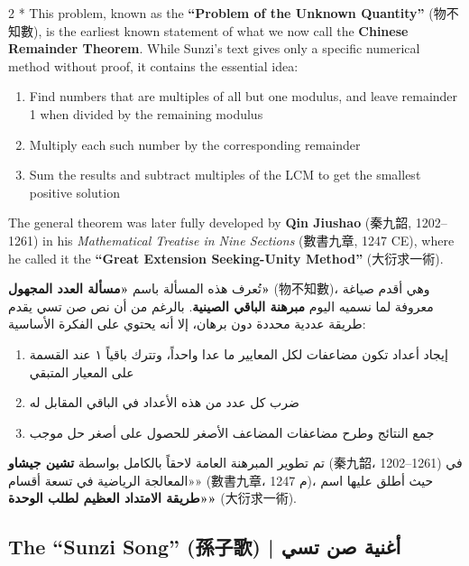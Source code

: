 \documentclass[11pt,a4paper]{article}
\newcommand{\ar}[1]{\arabicfont\beginR #1\endR}
\newcommand{\zh}[1]{{\CJKfamily{}#1}}
\begin{document}
\begin{paracol}{2}
\switchcolumn[0]*\noindent
This problem, known as the \textbf{``Problem of the Unknown Quantity''} (\zh{物不知數}), is the earliest known statement of what we now call the \textbf{Chinese Remainder Theorem}. While Sunzi's text gives only a specific numerical method without proof, it contains the essential idea:

\begin{enumerate}
  \item Find numbers that are multiples of all but one modulus, and leave remainder 1 when divided by the remaining modulus
  \item Multiply each such number by the corresponding remainder
  \item Sum the results and subtract multiples of the LCM to get the smallest positive solution
\end{enumerate}

The general theorem was later fully developed by \textbf{Qin Jiushao} (\zh{秦九韶}, 1202--1261) in his \textit{Mathematical Treatise in Nine Sections} (\zh{數書九章}, 1247 CE), where he called it the \textbf{``Great Extension Seeking-Unity Method''} (\zh{大衍求一術}).

\switchcolumn
\noindent
\ar{تُعرف هذه المسألة باسم \textbf{«مسألة العدد المجهول»} (物不知數)، وهي أقدم صياغة معروفة لما نسميه اليوم \textbf{مبرهنة الباقي الصينية}. بالرغم من أن نص صن تسي يقدم طريقة عددية محددة دون برهان، إلا أنه يحتوي على الفكرة الأساسية:}

\begin{enumerate}
  \item \ar{إيجاد أعداد تكون مضاعفات لكل المعايير ما عدا واحداً، وتترك باقياً ١ عند القسمة على المعيار المتبقي}
  \item \ar{ضرب كل عدد من هذه الأعداد في الباقي المقابل له}
  \item \ar{جمع النتائج وطرح مضاعفات المضاعف الأصغر للحصول على أصغر حل موجب}
\end{enumerate}

\ar{تم تطوير المبرهنة العامة لاحقاً بالكامل بواسطة \textbf{تشين جيشاو} (秦九韶، 1202–1261) في «المعالجة الرياضية في تسعة أقسام» (數書九章، 1247 م)، حيث أطلق عليها اسم \textbf{«طريقة الامتداد العظيم لطلب الوحدة»} (大衍求一術).}
\end{paracol}

\newpage

\subsection*{The ``Sunzi Song'' (\zh{孫子歌}) | \ar{أغنية صن تسي}}
\end{document}
